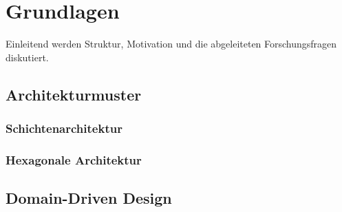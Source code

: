 

\chapter{Grundlagen}

Einleitend werden Struktur, Motivation und die abgeleiteten Forschungsfragen diskutiert.

\section{Architekturmuster}
\blindtext

\subsection{Schichtenarchitektur}
\blindtext

\subsection{Hexagonale Architektur}
\blindtext

\section{Domain-Driven Design}
\blindtext
